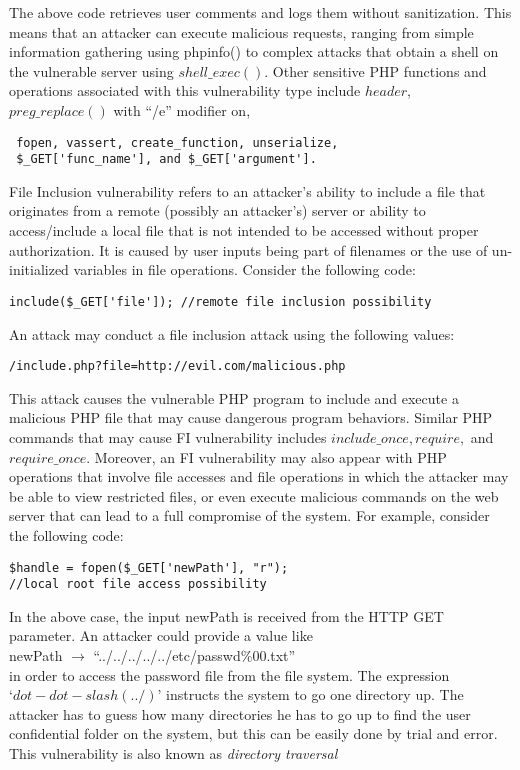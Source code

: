 The above code retrieves user comments and logs them without sanitization. This means that an attacker can execute
malicious requests, ranging from simple information gathering using phpinfo() to complex attacks that obtain a shell on the
vulnerable server using $ shell\_exec() $.
Other sensitive PHP functions and operations associated with this vulnerability type include $ header $, $ preg\_replace() $ with ``/e''
modifier on,
\begin{lstlisting}
 fopen, vassert, create_function, unserialize, 
 $_GET['func_name'], and $_GET['argument'].
\end{lstlisting}


File Inclusion vulnerability refers to an attacker’s ability to include a file that originates from a remote (possibly an attacker’s) server or
ability to access/include a local file that is not intended to be accessed without proper authorization. It is caused by user inputs
being part of filenames or the use of un-initialized variables in file operations. Consider the following code:
\begin{lstlisting}
include($_GET['file']); //remote file inclusion possibility
\end{lstlisting}
An attack may conduct a file inclusion attack using the following values:
\begin{lstlisting}
/include.php?file=http://evil.com/malicious.php
\end{lstlisting}
This attack causes the vulnerable PHP program to include and execute a malicious PHP file that may cause dangerous
program behaviors. Similar PHP commands that may cause FI vulnerability includes $ include\_once, require, $ and $ require\_once. $
Moreover, an FI vulnerability may also appear with PHP operations that involve file accesses and file operations in which the
attacker may be able to view restricted files, or even execute malicious commands on the web server that can lead to a full
compromise of the system. For example, consider the following code:
\begin{lstlisting}
$handle = fopen($_GET['newPath'], "r"); 
//local root file access possibility
\end{lstlisting}
In the above case, the input newPath is received from the HTTP GET parameter. An attacker could provide a value like\\
newPath $ \rightarrow $ ``../../../../../etc/passwd\%00.txt'' \\
in order to access the password file from the file system. The expression$  ‘dot-dot-slash (../)’ $ instructs the system to go one
directory up. The attacker has to guess how many directories he has to go up to find the user confidential folder on the system, but
this can be easily done by trial and error. This vulnerability is also known as \textit{directory traversal}

